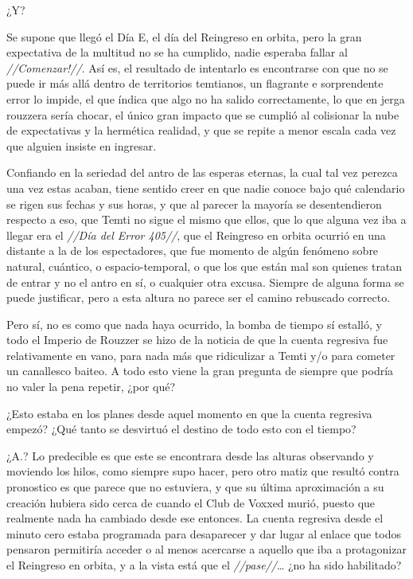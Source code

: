 \documentclass[
  spanish,
]{book}
\begin{document}
¿Y?

Se supone que llegó el Día E, el día del Reingreso en orbita, pero la gran expectativa de la multitud no se ha cumplido, nadie esperaba fallar al \emph{//Comenzar!//}. Así es, el resultado de intentarlo es encontrarse con que no se puede ir más allá dentro de territorios temtianos, un flagrante e sorprendente error lo impide, el que índica que algo no ha salido correctamente, lo que en jerga rouzzera sería chocar, el único gran impacto que se cumplió al colisionar la nube de expectativas y la hermética realidad, y que se repite a menor escala cada vez que alguien insiste en ingresar.

Confiando en la seriedad del antro de las esperas eternas, la cual tal vez perezca una vez estas acaban, tiene sentido creer en que nadie conoce bajo qué calendario se rigen sus fechas y sus horas, y que al parecer la mayoría se desentendieron respecto a eso, que Temti no sigue el mismo que ellos, que lo que alguna vez iba a llegar era el \emph{//Día del Error 405//}, que el Reingreso en orbita ocurrió en una distante a la de los espectadores, que fue momento de algún fenómeno sobre natural, cuántico, o espacio-temporal, o que los que están mal son quienes tratan de entrar y no el antro en sí, o cualquier otra excusa. Siempre de alguna forma se puede justificar, pero a esta altura no parece ser el camino rebuscado correcto.

Pero sí, no es como que nada haya ocurrido, la bomba de tiempo sí estalló, y todo el Imperio de Rouzzer se hizo de la noticia de que la cuenta regresiva fue relativamente en vano, para nada más que ridiculizar a Temti y/o para cometer un canallesco baiteo. A todo esto viene la gran pregunta de siempre que podría no valer la pena repetir, ¿por qué?

¿Esto estaba en los planes desde aquel momento en que la cuenta regresiva empezó? ¿Qué tanto se desvirtuó el destino de todo esto con el tiempo?

¿A.? Lo predecible es que este se encontrara desde las alturas observando y moviendo los hilos, como siempre supo hacer, pero otro matiz que resultó contra pronostico es que parece que no estuviera, y que su última aproximación a su creación hubiera sido cerca de cuando el Club de Voxxed murió, puesto que realmente nada ha cambiado desde ese entonces. La cuenta regresiva desde el minuto cero estaba programada para desaparecer y dar lugar al enlace que todos pensaron permitiría acceder o al menos acercarse a aquello que iba a protagonizar el Reingreso en orbita, y a la vista está que el \emph{//pase//}\ldots{} ¿no ha sido habilitado?
\end{document}
